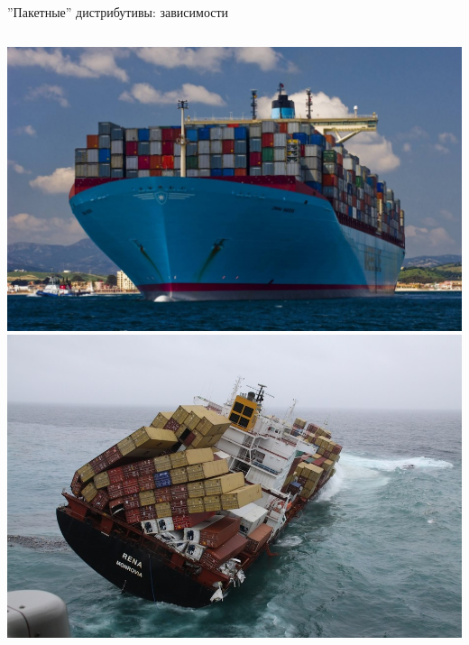\begin{frame}{''Пакетные'' дистрибутивы: зависимости}
    \begin{columns}
            \Large{}
            \center\includegraphics[width=1\textwidth]{../../slides/packaging/good-packaging.jpg}
            \Large{}
            \center\includegraphics[width=1\textwidth]{../../slides/packaging/wrong-packaging.jpg}
    \end{columns}
\end{frame}
